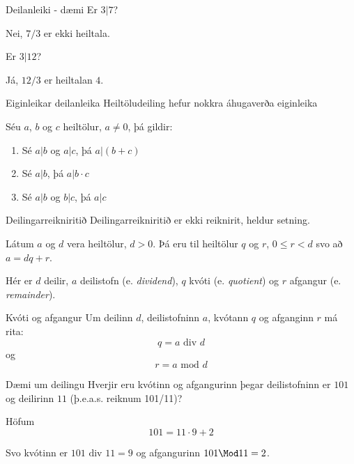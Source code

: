 \documentclass{beamer}
\begin{document}
\begin{frame}{Deilanleiki - dæmi}
Er $3|7$? \pause

Nei, $7/3$ er ekki heiltala. \pause

\vspace{0.5cm}
Er $3|12$? \pause

Já, $12/3$ er heiltalan $4$.
\end{frame}

\begin{frame}{Eiginleikar deilanleika}
Heiltöludeiling hefur nokkra áhugaverða eiginleika
\begin{tcolorbox}[title=Eiginleikar deilanleika]
Séu $a$, $b$ og $c$ heiltölur, $a \neq 0$, þá gildir:
\begin{enumerate}
 \item Sé $a|b$ og $a|c$, þá $a|(b+c)$
 \item Sé $a|b$, þá $a|b\cdot c$
 \item Sé $a|b$ og $b|c$, þá $a|c$
\end{enumerate}
\end{tcolorbox}
\end{frame}

\begin{frame}{Deilingarreikniritið}
Deilingarreikniritið er ekki reiknirit, heldur setning.

\begin{tcolorbox}[title=Deilingarreikniritið]
Látum $a$ og $d$ vera heiltölur, $d > 0$. 
Þá eru til heiltölur $q$ og $r$, $0 \leq r < d$ svo að $a = dq +r$.
\end{tcolorbox}

Hér er $d$ deilir, $a$ deilistofn (e. \emph{dividend}), $q$ kvóti (e. \emph{quotient}) og $r$ afgangur (e. \emph{remainder}).
\end{frame}


\begin{frame}{Kvóti og afgangur}
Um deilinn $d$, deilistofninn $a$, kvótann $q$ og afganginn $r$ má rita:
\[
 q = a \text{ div } d
\]
og
\[
 r = a \text{ mod } d
\]
\end{frame}

\begin{frame}{Dæmi um deilingu}
Hverjir eru kvótinn og afgangurinn þegar deilistofninn er $101$ og deilirinn $11$ (þ.e.a.s. reiknum 101/11)? \pause

Höfum
\[
 101 = 11 \cdot 9 + 2
\]

Svo kvótinn er $101 \text{ div } 11 = 9$ og afgangurinn $101 \Mod 11 = 2$.

\end{frame}
\end{document}
